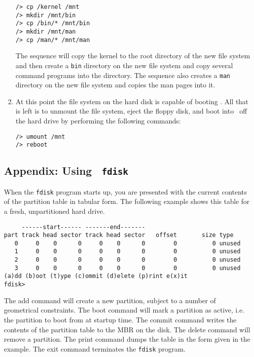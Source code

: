 \begin{enumerate}
\begin{verbatim}
/> cp /kernel /mnt
/> mkdir /mnt/bin
/> cp /bin/* /mnt/bin
/> mkdir /mnt/man
/> cp /man/* /mnt/man
\end{verbatim}

\noindent The sequence will copy the kernel to the root directory of the
new file system and then create a {\tt bin} directory on the new file
system and copy several command programs into the directory.  The
sequence also creates a {\tt man} directory on the new file system
and copies the man pages into it.

\item At this point the file system on the hard disk is capable of booting
\roadrunner.  All that is left is to unmount the file system, eject the
floppy disk, and boot into \roadrunner\  off the hard drive by performing
the following commands:

\begin{verbatim}
/> umount /mnt
/> reboot
\end{verbatim}

\end{enumerate}


\subsection*{Appendix: Using \roadrunner\  {\tt fdisk}}

When the {\tt fdisk} program starts up, you are presented with the
current contents of the partition table in tabular form.  The following
example shows this table for a fresh, unpartitioned hard drive.

{\small \begin{verbatim}
     ------start------ -------end-------
part track head sector track head sector   offset       size type
   0     0    0      0     0    0      0        0          0 unused
   1     0    0      0     0    0      0        0          0 unused
   2     0    0      0     0    0      0        0          0 unused
   3     0    0      0     0    0      0        0          0 unused
(a)dd (b)oot (t)ype (c)ommit (d)elete (p)rint e(x)it
fdisk>
\end{verbatim}}

The add command will create a new partition, subject to a number of
geometrical constraints.  The boot command will mark a partition as
active, i.e. the partition to boot from at startup time.  The commit
command writes the contents of the partition table to the MBR on the
disk.  The delete command will remove a partition.  The print command
dumps the table in the form given in the example.  The exit command
terminates the {\tt fdisk} program.

